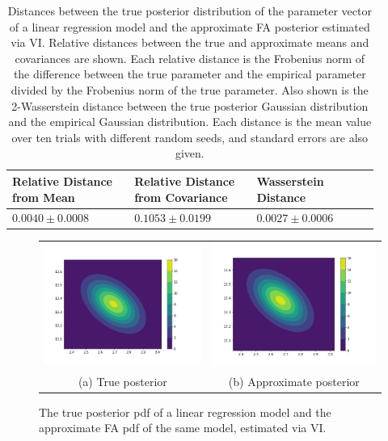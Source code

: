 \documentclass[msc,deptreport.inf]{infthesis} %
\begin{document}
\begin{table}[h!]
	\begin{center}
		\begin{tabular}{|| p{0.3\linewidth} p{0.3\linewidth} p{0.3\linewidth} ||} 
 			\hline
 			Relative Distance from Mean & Relative Distance from Covariance & Wasserstein Distance \\ [0.5ex] 
 			\hline\hline
 			$0.0040 \pm 0.0008$ & $ 0.1053 \pm 0.0199$ & $ 0.0027 \pm 0.0006$ \\ [1ex] 
			\hline
		\end{tabular}
		\caption{Distances between the true posterior distribution of the parameter vector of a linear regression model and the approximate FA posterior estimated via VI. Relative distances between the true and approximate means and covariances are shown. Each relative distance is the Frobenius norm of the difference between the true parameter and the empirical parameter divided by the Frobenius norm of the true parameter. Also shown is the 2-Wasserstein distance between the true posterior Gaussian distribution and the empirical Gaussian distribution. Each distance is the mean value over ten trials with different random seeds, and standard errors are also given.}
		\label{table:linear_regression_vi_posterior}
	\end{center}
\end{table}


\begin{figure}[!htbp] 
	\begin{tabular}{cc}
		 \includegraphics[width=70mm]{plots/linear_model_true_posterior.png}
		 & \includegraphics[width=70mm]{plots/linear_model_vi_posterior__latent_dim=2.png} \\
		 (a) True posterior
		 & (b) Approximate posterior \\[6pt]
	\end{tabular}
	\caption{The true posterior pdf of a linear regression model and the approximate FA pdf of the same model, estimated via VI.}
	\label{fig:linear_regression_vi_posterior}
\end{figure}
\end{document}
